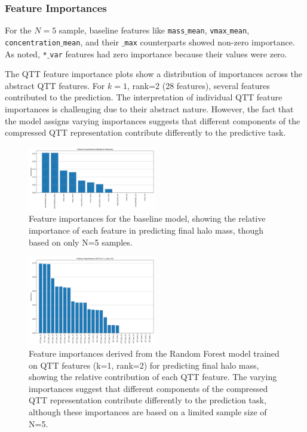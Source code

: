 \documentclass[twocolumn]{aastex631}
\begin{document}
\subsubsection{Feature Importances}
For the $N=5$ sample, baseline features like \texttt{mass\ensuremath{\_}mean}, \texttt{vmax\ensuremath{\_}mean}, \texttt{concentration\ensuremath{\_}mean}, and their \texttt{\ensuremath{\_}max} counterparts showed non-zero importance. As noted, \texttt{*\ensuremath{\_}var} features had zero importance because their values were zero.

The QTT feature importance plots show a distribution of importances across the abstract QTT features. For $k=1$, rank=2 (28 features), several features contributed to the prediction. The interpretation of individual QTT feature importances is challenging due to their abstract nature. However, the fact that the model assigns varying importances suggests that different components of the compressed QTT representation contribute differently to the predictive task.

\begin{figure}[h!]
    \centering
    \includegraphics[width=0.5\textwidth]{../input_files/plots/feature_importances_baseline_3_20250524-175150.png}
    \caption{Feature importances for the baseline model, showing the relative importance of each feature in predicting final halo mass, though based on only N=5 samples.
}
    \label{fig:feature_importances_baseline}
\end{figure}

\begin{figure}[h!]
    \centering
    \includegraphics[width=0.5\textwidth]{../input_files/plots/feature_importances_qtt_k1_r2_6_20250524-175150.png}
    \caption{Feature importances derived from the Random Forest model trained on QTT features (k=1, rank=2) for predicting final halo mass, showing the relative contribution of each QTT feature. The varying importances suggest that different components of the compressed QTT representation contribute differently to the prediction task, although these importances are based on a limited sample size of N=5.
}
    \label{fig:feature_importances_qtt}
\end{figure}
\end{document}
